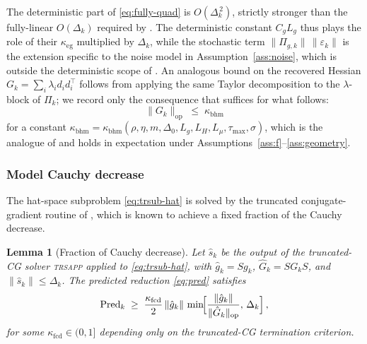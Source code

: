 \documentclass[11pt,a4paper]{article}
\newtheorem{lemma}[theorem]{Lemma}
\begin{document}
The deterministic part of \eqref{eq:fully-quad} is
$O(\Delta_k^{\,2})$, strictly stronger than the fully-linear
$O(\Delta_k)$ required by
\cite[Definition~3.1]{ConnScheinbergVicente2009SIOPT}. The
deterministic constant $C_gL_g$ thus plays the role of their
$\kappa_{\mathrm{eg}}$ multiplied by $\Delta_k$, while the
stochastic term $\|\Pi_{g,k}\|\,\|\varepsilon_k\|$ is the
extension specific to the noise model in
Assumption~\ref{ass:noise}, which is outside the deterministic
scope of \cite{ConnScheinbergVicente2009SIOPT}. An analogous
bound on the recovered Hessian $G_k=\sum_i\lambda_id_id_i^{\!\top}$
follows from applying the same Taylor decomposition to the
$\lambda$-block of $\Pi_k$; we record only the consequence that
suffices for what follows:
\begin{equation}\label{eq:G-bound}
  \|G_k\|_{\mathrm{op}}\;\le\;\kappa_{\mathrm{bhm}}
\end{equation}
for a constant $\kappa_{\mathrm{bhm}}=\kappa_{\mathrm{bhm}}(\rho,\eta,m,\Delta_0,L_g,L_H,L_\mu,\tau_{\max},\sigma)$,
which is the analogue of
\cite[Assumption~5.2]{ConnScheinbergVicente2009SIOPT} and holds
in expectation under Assumptions~\ref{ass:f}--\ref{ass:geometry}.

\subsubsection*{Model Cauchy decrease}

The hat-space subproblem \eqref{eq:trsub-hat} is solved by the
truncated conjugate-gradient routine of
\cite{Powell2006NEWUOA}, which is known to achieve a fixed
fraction of the Cauchy decrease.

\begin{lemma}[Fraction of Cauchy decrease]
\label{lem:cauchy-decrease}
Let $\hat s_k$ be the output of the truncated-CG solver
\textsc{trsapp} applied to \eqref{eq:trsub-hat}, with
$\hat g_k=Sg_k$, $\hat G_k=SG_kS$, and $\|\hat s_k\|\le\Delta_k$.
The predicted reduction \eqref{eq:pred} satisfies
\begin{equation}\label{eq:cauchy}
  \mathrm{Pred}_k
  \;\ge\;\frac{\kappa_{\mathrm{fcd}}}{2}\,
  \|\hat g_k\|\,
  \min\!\Bigl[\frac{\|\hat g_k\|}{\|\hat G_k\|_{\mathrm{op}}},\,\Delta_k\Bigr]\,,
\end{equation}
for some $\kappa_{\mathrm{fcd}}\in(0,1]$ depending only on the
truncated-CG termination criterion.
\end{lemma}
\end{document}
